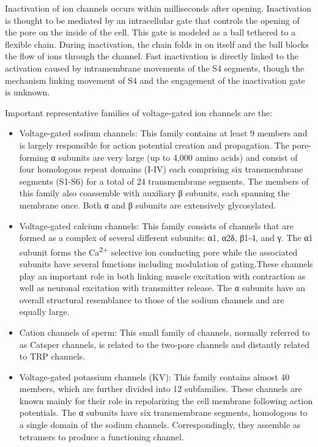 Inactivation of ion channels occurs within milliseconds after opening. Inactivation is thought to be mediated by an intracellular gate that controls the opening of the pore on the inside of the cell. This gate is modeled as a ball tethered to a flexible chain. During inactivation, the chain folds in on itself and the ball blocks the flow of ions through the channel. Fast inactivation is directly linked to the activation caused by intramembrane movements of the S4 segments, though the mechanism linking movement of S4 and the engagement of the inactivation gate is unknown.

Important representative families of voltage-gated ion channels are the:

\begin{itemize}
\tightlist
\item
  Voltage-gated sodium channels: This family contains at least 9 members and is largely responsible for action potential creation and propagation. The pore-forming α subunits are very large (up to 4,000 amino acids) and consist of four homologous repeat domains (I-IV) each comprising six transmembrane segments (S1-S6) for a total of 24 transmembrane segments. The members of this family also coassemble with auxiliary β subunits, each spanning the membrane once. Both α and β subunits are extensively glycosylated.
\item
  Voltage-gated calcium channels: This family consists of channels that are formed as a complex of several different subunits: α1, α2δ, β1-4, and γ. The α1 subunit forms the Ca\textsuperscript{2+} selective ion conducting pore while the associated subunits have several functions including modulation of gating.These channels play an important role in both linking muscle excitation with contraction as well as neuronal excitation with transmitter release. The α subunits have an overall structural resemblance to those of the sodium channels and are equally large.
\item
  Cation channels of sperm: This small family of channels, normally referred to as Catsper channels, is related to the two-pore channels and distantly related to TRP channels.
\item
  Voltage-gated potassium channels (KV): This family contains almost 40 members, which are further divided into 12 subfamilies. These channels are known mainly for their role in repolarizing the cell membrane following action potentials. The α subunits have six transmembrane segments, homologous to a single domain of the sodium channels. Correspondingly, they assemble as tetramers to produce a functioning channel.

\end{itemize}
